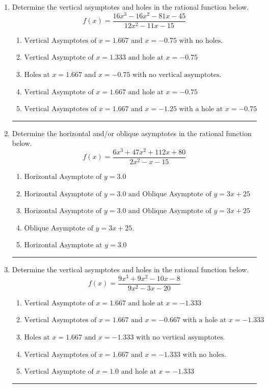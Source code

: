 \documentclass[14pt]{extbook}
\newcommand{\litem}[1]{\item#1\hspace*{-1cm}\rule{\textwidth}{0.4pt}}
\begin{document}
\begin{enumerate}
{\begin{enumerate}[label=\Alph*.]
\end{enumerate} }
\litem{
Determine the vertical asymptotes and holes in the rational function below.\[ f(x) = \frac{16x^{3} -16 x^{2} -81 x -45}{12x^{2} -11 x -15} \]\begin{enumerate}[label=\Alph*.]
\item \( \text{Vertical Asymptotes of } x = 1.667 \text{ and } x = -0.75 \text{ with no holes.} \)
\item \( \text{Vertical Asymptote of } x = 1.333 \text{ and hole at } x = -0.75 \)
\item \( \text{Holes at } x = 1.667 \text{ and } x = -0.75 \text{ with no vertical asymptotes.} \)
\item \( \text{Vertical Asymptote of } x = 1.667 \text{ and hole at } x = -0.75 \)
\item \( \text{Vertical Asymptotes of } x = 1.667 \text{ and } x = -1.25 \text{ with a hole at } x = -0.75 \)

\end{enumerate} }
\litem{
Determine the horizontal and/or oblique asymptotes in the rational function below.\[ f(x) = \frac{6x^{3} +47 x^{2} +112 x + 80}{2x^{2} -x -15} \]\begin{enumerate}[label=\Alph*.]
\item \( \text{Horizontal Asymptote of } y = 3.0  \)
\item \( \text{Horizontal Asymptote of } y = 3.0 \text{ and Oblique Asymptote of } y = 3x + 25 \)
\item \( \text{Horizontal Asymptote of } y = 3.0 \text{ and Oblique Asymptote of } y = 3x + 25 \)
\item \( \text{Oblique Asymptote of } y = 3x + 25. \)
\item \( \text{Horizontal Asymptote at } y = 3.0 \)

\end{enumerate} }
\litem{
Determine the vertical asymptotes and holes in the rational function below.\[ f(x) = \frac{9x^{3} +9 x^{2} -10 x -8}{9x^{2} -3 x -20} \]\begin{enumerate}[label=\Alph*.]
\item \( \text{Vertical Asymptote of } x = 1.667 \text{ and hole at } x = -1.333 \)
\item \( \text{Vertical Asymptotes of } x = 1.667 \text{ and } x = -0.667 \text{ with a hole at } x = -1.333 \)
\item \( \text{Holes at } x = 1.667 \text{ and } x = -1.333 \text{ with no vertical asymptotes.} \)
\item \( \text{Vertical Asymptotes of } x = 1.667 \text{ and } x = -1.333 \text{ with no holes.} \)
\item \( \text{Vertical Asymptote of } x = 1.0 \text{ and hole at } x = -1.333 \)


\end{enumerate}}
\end{enumerate}
\end{document}
